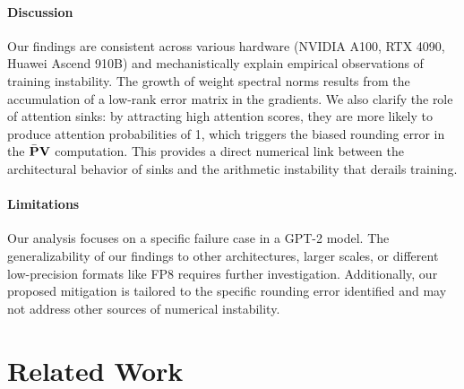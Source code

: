 \documentclass{article} %
\begin{document}
\paragraph{Discussion}
Our findings are consistent across various hardware (NVIDIA A100, RTX 4090, Huawei Ascend 910B) and mechanistically explain empirical observations of training instability. The growth of weight spectral norms results from the accumulation of a low-rank error matrix in the gradients. We also clarify the role of attention sinks: by attracting high attention scores, they are more likely to produce attention probabilities of 1, which triggers the biased rounding error in the $\bar{{\mathbf{P}}}{\mathbf{V}}$ computation. This provides a direct numerical link between the architectural behavior of sinks and the arithmetic instability that derails training.

\paragraph{Limitations}
Our analysis focuses on a specific failure case in a GPT-2 model. The generalizability of our findings to other architectures, larger scales, or different low-precision formats like FP8 requires further investigation. Additionally, our proposed mitigation is tailored to the specific rounding error identified and may not address other sources of numerical instability.




\nocite{*} %



\newpage
\appendix


\section{Related Work}
\end{document}
